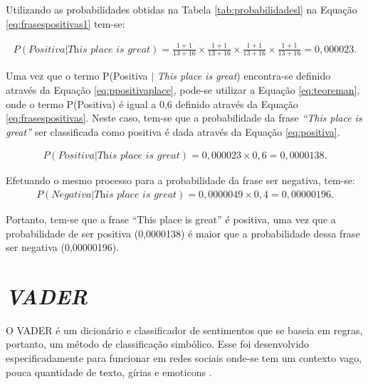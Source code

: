 Utilizando as probabilidades obtidas na Tabela
\ref{tab:probabilidadesl} na Equação \ref{eq:frasespositivas1} tem-se:

\begin{equation}
\begin{gathered}
P(Positiva|\textit{This place is great}) = \frac{1 + 1}{13 + 16} \times
\frac{1 + 1}{13 + 16} \times \frac{1 + 1}{13 + 16} \times
\frac{1 + 1}{13 + 16} = 0,000023.
\label{eq:ppositivaplace}
\end{gathered}
\end{equation}

Uma vez que o termo P(Positiva $\vert$ \textit{This place is great})
encontra-se definido através da Equação \ref{eq:ppositivaplace}, pode-se
utilizar a Equação \ref{eq:teoreman}, onde o termo P(Positiva) é igual a 0,6
definido através da Equação \ref{eq:frasespositivas}. Neste caso, tem-se que a
probabilidade da frase \textit{``This place is great''} ser classificada como
positiva é dada através da Equação \ref{eq:positiva}.

\begin{equation}
\begin{gathered}
P(Positiva|\textit{This place is great})
=
0,000023 \times
0,6 = 0,0000138.
\label{eq:positiva}
\end{gathered}
\end{equation}

Efetuando o mesmo processo para a probabilidade da frase ser negativa, tem-se:
\begin{equation}
\begin{gathered}
P(Negativa|\textit{This place is great})
=
0,0000049 \times
0,4 = 0,00000196.
\label{eq:negativa}
\end{gathered}
\end{equation}

Portanto, tem-se que a frase ``This place is great'' é positiva, uma vez que a
probabilidade de ser positiva (0,0000138) é maior que a probabilidade dessa
frase ser negativa (0,00000196).

\section{\textit{VADER}}

O \ac{VADER} é um dicionário e classificador de sentimentos que se baseia em
regras, portanto, um método de classificação simbólico. Esse foi desenvolvido
especificadamente para funcionar em redes sociais onde-se tem um contexto
vago, pouca quantidade de texto, gírias e emoticons \cite{conf/icwsm/HuttoG14}.

